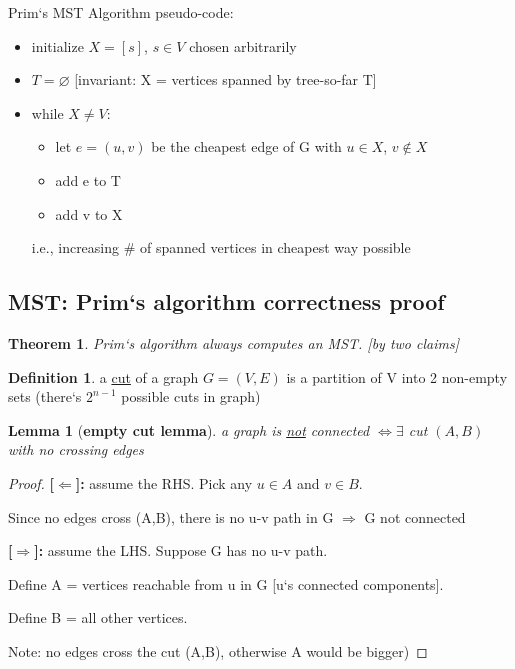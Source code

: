 \documentclass[a4paper,12pt]{article}
\theoremstyle{plain}
\newtheorem*{theorem}{Theorem}
\newtheorem*{lemma}{Lemma}
\theoremstyle{definition}
\newtheorem*{definition}{Definition}
\theoremstyle{remark}
\begin{document}
Prim`s MST Algorithm pseudo-code:
\begin{itemize}
\item initialize $X=[s]$, $s \in V$ chosen arbitrarily
\item $T =\varnothing$ [invariant: X = vertices spanned by tree-so-far T]
\item while $X \neq V$:
	\begin{itemize}
		\item let $e = (u,v)$ be the cheapest edge of G with $u \in X$, $v \notin X$ 
		\item add e to T
		\item add v to X
	\end{itemize}
	i.e., increasing $\#$ of spanned vertices in cheapest way possible
\end{itemize}



\subsection{MST: Prim`s algorithm correctness proof}
\begin{theorem}Prim`s algorithm always computes an MST. [by two claims]\end{theorem}

\begin{definition} a \underline{cut} of a graph $G=(V,E)$ is a partition of V into 2 non-empty sets (there`s $2^{n-1}$ possible cuts in graph)\end{definition} 

\begin{lemma}[\textbf{empty cut lemma}] a graph is \underline{not} connected $\iff \exists$ cut $(A,B)$ with no crossing edges\end{lemma}
\begin{proof}

\textbf{[$\Leftarrow$]:} assume the RHS. Pick any $u \in A$ and $v \in B$.

Since no edges cross (A,B), there is no u-v path in G $\Rightarrow$ G not connected

\textbf{[$\Rightarrow$]:} assume the LHS. Suppose G has no u-v path.

Define A = {vertices reachable from u in G} [u`s connected components].

Define B = {all other vertices}.

Note: no edges cross the cut (A,B), otherwise A would be bigger)
\end{proof}
\end{document}
